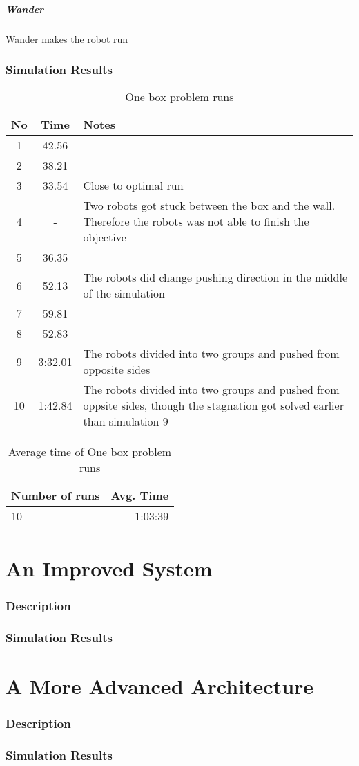 \documentclass{article}
\begin{document}
\subsubsection{Wander}
Wander makes the robot run 
\section{Simulation Results}

\begin{table}
\centering
\begin{tabular}{ c | c | p{5cm}}
\hline No & Time & Notes \\ \hline
 1 & 42.56 &  \\ \hline
 2 & 38.21 & \\ \hline
 3 & 33.54 & Close to optimal run \\ \hline
4 & - & Two robots got stuck between the box and the wall. Therefore the robots was not able to finish the objective \\ \hline
5 & 36.35 & \\ \hline
6	& 52.13 & The robots did change pushing direction in the middle of the simulation \\ \hline
7 & 59.81 & \\ \hline
8 & 52.83 & \\ \hline
9 & 3:32.01 &  The robots divided into two groups and pushed from opposite sides \\ \hline
10 & 1:42.84 & The robots divided into two groups and pushed from oppsite sides, though the stagnation got solved earlier than simulation 9 \\
\end{tabular}
\caption{One box problem runs}
\end{table}


\begin{table}
\centering
\begin{tabular}{ l | r}
\hline Number of runs & Avg. Time \\ \hline
10 & 1:03:39 \\
\end{tabular}
\caption{ Average time of One box problem runs}
\end{table}
\part{An Improved System}

\section{Description}
\section{Simulation Results}

\part{A More Advanced Architecture}

\section{Description}
\section{Simulation Results}
\end{document}
